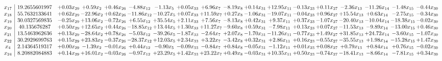 \documentclass[9pt]{article}
\begin{document}
 \[\begin{array}{c| c c@{\hskip 2pt} c@{\hskip 2pt} c@{\hskip 2pt} c@{\hskip 2pt} c@{\hskip 2pt} c@{\hskip 2pt} c@{\hskip 2pt} c@{\hskip 2pt} c@{\hskip 2pt} c@{\hskip 2pt} c@{\hskip 2pt} c@{\hskip 2pt} c@{\hskip 2pt} c@{\hskip 2pt} c@{\hskip 2pt} c@{\hskip 2pt} }
 x_{17}   &  19.2655601997 & +  0.03 x_{29} & +  0.59 x_{2} & +  0.46 x_{26} & -4.88 x_{12} & -1.13 x_{5} & +  0.05 x_{33} & +  6.96 x_{7} & -8.19 x_{8} & +  0.14 x_{31} & + 12.95 x_{11} & -0.13 x_{23} & +  0.11 x_{27} & -2.36 x_{13} & -11.26 x_{14} & -1.48 x_{15} & -0.44 x_{30}\\
 x_{18}   &  55.7632133641 & +  0.62 x_{29} & -22.96 x_{2} & +  0.62 x_{26} & -11.86 x_{12} & -10.27 x_{5} & +  0.07 x_{33} & + 11.59 x_{7} & +  0.27 x_{8} & -1.06 x_{31} & -19.07 x_{11} & -0.04 x_{23} & +  0.96 x_{27} & + 15.54 x_{13} & +  0.63 x_{14} & -2.75 x_{15} & -0.34 x_{30}\\
 x_{19}   &  30.0327569835 & -0.25 x_{29} & + 13.06 x_{2} & -0.72 x_{26} & +  6.55 x_{12} & + 35.54 x_{5} & +  2.11 x_{33} & +  7.56 x_{7} & -8.13 x_{8} & +  0.42 x_{31} & +  9.37 x_{11} & +  0.37 x_{23} & -1.07 x_{27} & -20.40 x_{13} & -10.04 x_{14} & -18.38 x_{15} & -0.02 x_{30}\\
 x_{20}   &  40.135676287 & +  0.50 x_{29} & + 12.65 x_{2} & +  0.44 x_{26} & -18.85 x_{12} & + 13.44 x_{5} & +  1.30 x_{33} & + 11.27 x_{7} & -9.60 x_{8} & +  0.59 x_{31} & -7.98 x_{11} & +  0.13 x_{23} & +  0.07 x_{27} & -11.53 x_{13} & -9.89 x_{14} & -13.00 x_{15} & +  0.46 x_{30}\\
 x_{21}   &  13.5463962636 & +  0.13 x_{29} & -28.64 x_{2} & +  0.78 x_{26} & -5.03 x_{12} & -39.26 x_{5} & -1.87 x_{33} & -2.64 x_{7} & +  2.07 x_{8} & -1.70 x_{31} & -11.26 x_{11} & -0.77 x_{23} & +  1.49 x_{27} & + 31.85 x_{13} & + 24.72 x_{14} & -3.60 x_{15} & -1.07 x_{30}\\
 x_{22}   &  30.2929699763 & +  0.15 x_{29} & + 23.83 x_{2} & -0.37 x_{26} & -28.37 x_{12} & + 12.03 x_{5} & +  2.34 x_{33} & +  3.22 x_{7} & -3.42 x_{8} & +  0.32 x_{31} & +  2.86 x_{11} & +  0.16 x_{23} & -0.55 x_{27} & -35.55 x_{13} & +  1.98 x_{14} & -15.28 x_{15} & +  1.47 x_{30}\\
 x_{4}   &  2.14364519317 & +  0.00 x_{29} & -1.39 x_{2} & -0.01 x_{26} & +  0.44 x_{12} & -0.90 x_{5} & -0.09 x_{33} & -0.84 x_{7} & +  0.84 x_{8} & -0.05 x_{31} & -1.12 x_{11} & +  0.01 x_{23} & +  0.08 x_{27} & +  0.79 x_{13} & +  0.84 x_{14} & +  0.76 x_{15} & -0.02 x_{30}\\
 x_{24}   &  8.20882084883 & +  0.14 x_{29} & + 16.01 x_{2} & -0.03 x_{26} & -0.97 x_{12} & + 23.29 x_{5} & +  1.42 x_{33} & + 23.22 x_{7} & +  0.49 x_{8} & -0.03 x_{31} & + 10.35 x_{11} & +  0.50 x_{23} & -0.74 x_{27} & -18.41 x_{13} & -8.66 x_{14} & -7.81 x_{15} & +  0.34 x_{30}\\

\end{array}\]
\end{document}
